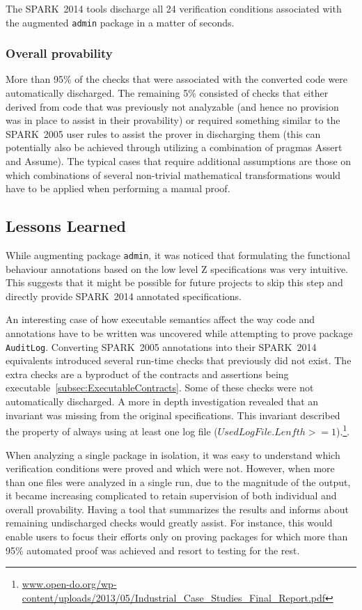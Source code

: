 \documentclass[10pt,a4paper,twocolumn]{article}
\newcommand{\oldspark}{SPARK~2005\xspace}
\newcommand{\newspark}{SPARK~2014\xspace}
\newcommand{\SPARK}[1]{\lstinline[language=Ada,basicstyle={\footnotesize
      \sffamily},framesep=0pt]$#1$}
\begin{document}
The \newspark tools discharge all 24 verification conditions
associated with the augmented \SPARK{admin} package in a matter of
seconds.

\subsubsection{Overall provability}

More than 95\% of the checks that were associated with the converted
code were automatically discharged. The remaining 5\% consisted of
checks that either derived from code that was previously not
analyzable (and hence no provision was in place to assist in their
provability) or required something similar to the \oldspark user rules
to assist the prover in discharging them (this can potentially also be
achieved through utilizing a combination of pragmas Assert and
Assume). The typical cases that require additional assumptions are
those on which combinations of several non-trivial mathematical
transformations would have to be applied when performing a manual
proof.

\subsection{Lessons Learned}

While augmenting package \SPARK{admin}, it was noticed that formulating
the functional behaviour annotations based on the low level Z
specifications was very intuitive. This suggests that it might be
possible for future projects to skip this step and directly provide
\newspark annotated specifications.

An interesting case of how executable semantics affect the way code
and annotations have to be written was uncovered while attempting to
prove package \SPARK{AuditLog}. Converting \oldspark annotations into
their \newspark equivalents introduced several run-time checks that
previously did not exist. The extra checks are a byproduct of the
contracts and assertions being
executable~\ref{subsec:ExecutableContracts}. Some of these checks were
not automatically discharged. A more in depth investigation revealed
that an invariant was missing from the original specifications. This
invariant described the property of always using at least one log file
($UsedLogFile.Lenfth >= 1$).\footnote{\url{www.open-do.org/wp-content/uploads/2013/05/Industrial_Case_Studies_Final_Report.pdf}}.

When analyzing a single package in isolation, it was easy to
understand which verification conditions were proved and which were
not. However, when more than one files were analyzed in a single run,
due to the magnitude of the output, it became increasing complicated
to retain supervision of both individual and overall
provability. Having a tool that summarizes the results and informs
about remaining undischarged checks would greatly assist. For
instance, this would enable users to focus their efforts only on
proving packages for which more than 95\% automated proof was
achieved and resort to testing for the rest.
\end{document}
